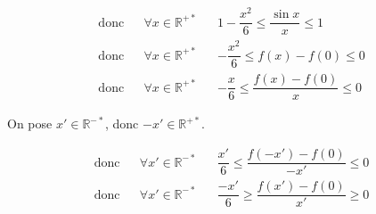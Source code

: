 \documentclass[a4paper,french,bookmarks]{article}
\begin{document}
\begin{enumerate}
\begin{enumerate}
\begin{tcolorbox}[colback=black!3,colframe=black!9,boxrule=.25pt,enhanced,arc is angular,arc=0pt]
\begin{align*}
        \text{donc} && \forall x \in \mathbb{R}^{+*} && 1 - \dfrac{x^2}{6} \leq \dfrac{\sin x}{x} \leq 1\\
        \text{donc} && \forall x \in \mathbb{R}^{+*} && - \dfrac{x^2}{6} \leq f\left(x\right) - f\left(0\right)\leq 0\\
        \text{donc} && \forall x \in \mathbb{R}^{+*} && - \dfrac{x}{6} \leq \dfrac{f\left(x\right) - f\left(0\right)}{x}\leq 0
    \end{align*}
                \end{tcolorbox}
     \begin{tcolorbox}[colback=black!3,colframe=black!9,boxrule=.25pt,enhanced,arc is angular,arc=0pt]
            
    On pose $x' \in \mathbb{R}^{-*}$, donc $-x' \in \mathbb{R}^{+*}$.

    \begin{align*}
        \text{donc} && \forall x' \in \mathbb{R}^{-*} &&  \dfrac{x'}{6} \leq \dfrac{f\left(-x'\right) - f\left(0\right)}{-x'}\leq 0\\
        \text{donc} && \forall x' \in \mathbb{R}^{-*} &&  \dfrac{-x'}{6} \geq \dfrac{f\left(x'\right) - f\left(0\right)}{x'}\geq 0\\
    \end{align*}


\end{tcolorbox}
\end{enumerate}
\end{enumerate}
\end{document}
